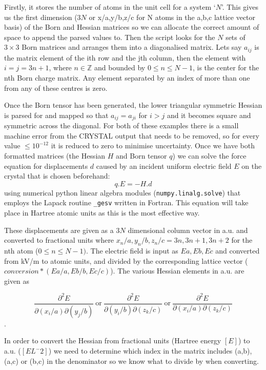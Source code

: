 \documentclass[10pt]{article}
\begin{document}
Firstly, it stores the number of atoms in the unit cell for a system `$N$'. This gives us the first dimension ($3N$ or x/a,y/b,z/c for N atoms in the a,b,c lattice vector basis) of the Born and Hessian matrices so we can allocate the correct amount of space to append the parsed values to. Then the script looks for the $N$ sets of $3\times3$ Born matrices and arranges them into a diagonalised matrix. Lets say $a_{ij}$ is the matrix element of the ith row and the jth column, then the element with $i = j = 3n+1$, where $n \in \mathbb{Z}$ and bounded by $0 \leq n \leq N-1$, is the center for the nth Born charge matrix. Any element separated by an index of more than one from any of these centres is zero.

Once the Born tensor has been generated, the lower triangular symmetric Hessian is parsed for and mapped so that $a_{ij} = a_{ji}$ for $i > j$ and it becomes square and symmetric across the diagonal. For both of these examples there is a small machine error from the CRYSTAL output that needs to be removed, so for every value $\leq 10^{-12}$ it is reduced to zero to minimise uncertainty. Once we have both formatted matrices (the Hessian $H$ and Born tensor $q$) we can solve the force equation for displacements $d$ caused by an incident uniform electric field $E$ on the crystal that is chosen beforehand:
\begin{equation*}
q.E = -H.d
\end{equation*}
using numerical python linear algebra modules (\texttt{numpy.linalg.solve}) that employs the Lapack routine \texttt{\_gesv} written in Fortran. This equation will take place in Hartree atomic units as this is the most effective way.

These displacements are given as a $3N$ dimensional column vector in a.u. and converted to fractional units where $x_n/a,y_n/b,z_n/c = 3n, 3n+1, 3n+2$ for the nth atom ($0\leq n \leq N-1)$. The electric field is input as $Ea,Eb,Ec$ and converted from kV/m to atomic units, and divided by the corresponding lattice vector ($conversion*(Ea/a,Eb/b,Ec/c)$). The various Hessian elements in a.u. are given as

 $$\frac{\partial^2E}{\partial(x_i/a)\partial(y_j/b)} \ \text{or} \ \frac{\partial^2E}{\partial(y_i/b)\partial(z_k/c)} \ \text{or} \ \frac{\partial^2E}{\partial(x_i/a)\partial(z_k/c)}$$.

In order to convert the Hessian from fractional units (Hartree energy $[E]$) to a.u. ($[E L^-2]$) we need to determine which index in the matrix includes (a,b), (a,c) or (b,c) in the denominator so we know what to divide by when converting.
\end{document}
